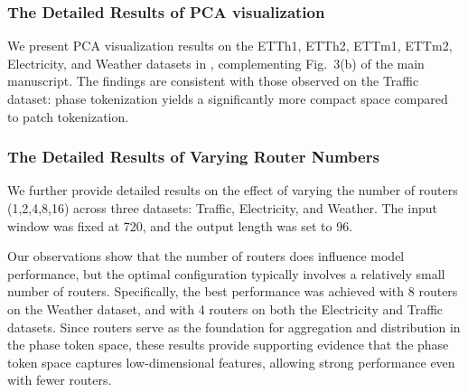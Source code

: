 \subsubsection{The Detailed Results of PCA visualization}

We present PCA visualization results on the ETTh1, ETTh2, ETTm1, ETTm2, Electricity, and Weather datasets in , complementing Fig.~3(b) of the main manuscript.
The findings are consistent with those observed on the Traffic dataset: phase tokenization yields a significantly more compact space compared to patch tokenization.


\subsubsection{The Detailed Results of Varying Router Numbers}
\label{sec:all_results_router_numbers}
We further provide detailed results on the effect of varying the number of routers (1,2,4,8,16) across three datasets: Traffic, Electricity, and Weather. The input window was fixed at 720, and the output length was set to 96.

Our observations show that the number of routers does influence model performance, but the optimal configuration typically involves a relatively small number of routers. Specifically, the best performance was achieved with 8 routers on the Weather dataset, and with 4 routers on both the Electricity and Traffic datasets.
Since routers serve as the foundation for aggregation and distribution in the phase token space, these results provide supporting evidence that the phase token space captures low-dimensional features, allowing strong performance even with fewer routers.



